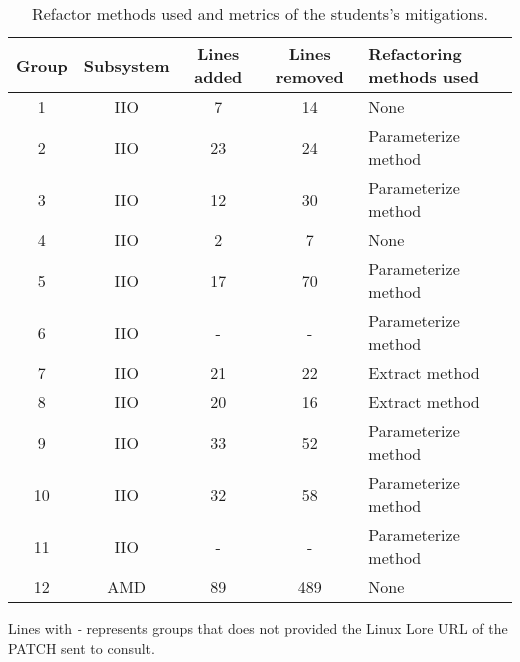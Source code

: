 \begin{table}
\begin{tabular}{ | c | c | c | c | m{6em} | }

\hline

\textbf{Group} & \textbf{Subsystem} & \textbf{Lines added} & \textbf{Lines removed} & \textbf{Refactoring methods used}
\\ \hline 

1 & IIO & 7 & 14 & None \\ \hline
2 & IIO & 23 & 24 & Parameterize method \\ \hline
3 & IIO & 12 & 30 & Parameterize method \\ \hline
4 & IIO & 2 & 7 & None \\ \hline
5 & IIO & 17 & 70 & Parameterize method \\ \hline
6 & IIO & - & - & Parameterize method \\ \hline
7 & IIO & 21 & 22  & Extract method \\ \hline
8 & IIO & 20 & 16 & Extract method \\ \hline
9 & IIO & 33 & 52 & Parameterize method \\ \hline
10 & IIO & 32 & 58 & Parameterize method \\ \hline
11 & IIO & - & - & Parameterize method \\ \hline
12 & AMD & 89 & 489 & None \\ \hline

\hline
\end{tabular}
Lines with \textit{-} represents groups that does not provided the Linux Lore URL of the PATCH sent to consult.
\caption{Refactor methods used and metrics of the students's mitigations.}
\label{tab:stu}
\end{table}
